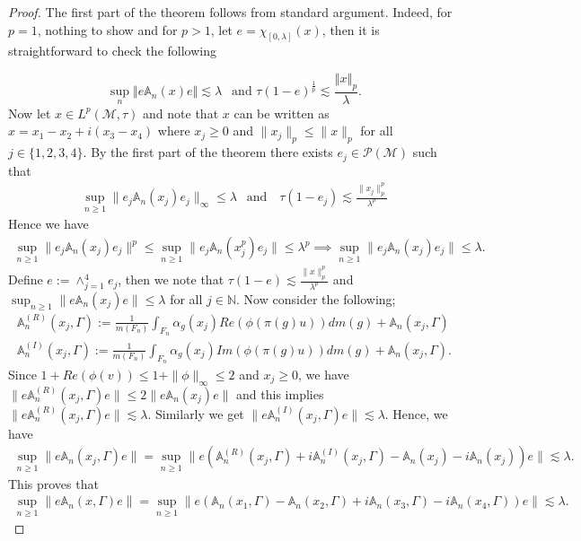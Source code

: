 \documentclass[11pt]{amsart}
\theoremstyle{definition}
\theoremstyle{myremark}
\numberwithin{equation}{section}
\def\A{\mathbb A}
\def\N{\mathbb N}
\newcommand{\CM}{\mathcal{M}}
\newcommand{\CP}{\mathcal{P}}
\newcommand{\norm}[1]{\left\Vert#1\right\Vert}
\begin{document}
\begin{proof}
The first part of the theorem follows from standard argument. Indeed, for $p=1$, nothing to show  and for $ p> 1$, let $e = \chi_{ [0, \lambda]}(x) $, then it is straightforward to check the following

$$ 
\sup_n \norm{ e\A_n( x) e } \lesssim \lambda ~~\text{ and } \tau( 1-e)^{ \frac{1}{p}}  \lesssim\frac{ \norm{ x}_p}{ \lambda}.
$$
Now let $ x \in L^p(\CM, \tau)$ and note that 
     $x$ can be written as $x=x_1-x_2+i(x_3-x_4)$ where $x_j \geq 0$ and $\|x_j\|_p \leq \|x\|_p $ for all $j\in \{1,2,3,4\}$.  By the first part of the theorem 
    there exists $e_j \in \CP(\CM)$ such that 
    \begin{align*}
        \displaystyle\sup_{n\geq1}\|e_j\A_n(x_j)e_j\|_\infty \leq \lambda ~~\text{ and }~~\ \tau(1-e_j)\lesssim \frac{\|x_j\|_p^p}{\lambda^p} 
    \end{align*}
  Hence we have 
    \begin{align*}
        \sup_{n\geq 1} \|e_j\A_n(x_j)e_j\|^p \leq  \sup_{n\geq 1} \|e_j\A_n(x_j^p)e_j\| \leq \lambda^p
        \implies  \sup_{n\geq 1} \|e_j\A_n(x_j)e_j\| \leq \lambda.
    \end{align*}
Define $e:=\wedge_{j=1}^4e_j$, then we note that  $\tau(1-e)\lesssim \frac{\|x\|_p^p}{\lambda^p}$ and  $\displaystyle\sup_{n\geq1}\|e\A_n(x_j)e\| \leq \lambda$ for all $ j \in \N$.
    Now consider the following;
    \begin{align*}
        \A_n^{(R)}(x_j,\Gamma):= \frac{1}{m(F_n)}\int_{F_n}\alpha_g(x_j)Re(\phi(\pi(g)u)) dm(g) + \A_n(x_j, \Gamma)\\
        \A_n^{(I)}(x_j,\Gamma):= \frac{1}{m(F_n)}\int_{F_n}\alpha_g(x_j)Im(\phi(\pi(g)u)) dm(g) + \A_n(x_j, \Gamma).
    \end{align*}
    Since $1+Re(\phi(v)) \leq 1+\|\phi\|_\infty \leq 2$ and $x_j \geq 0$,  we have  $ \|e\A_n^{(R)}(x_j,\Gamma)e\| \leq 2 \|e\A_n(x_j)e\|$
  and this implies  $  \|e\A_n^{(R)}(x_j,\Gamma)e\| \lesssim\lambda.$
    Similarly we get $  \|e\A_n^{(I)}(x_j,\Gamma)e\| \lesssim \lambda.$
Hence,  we have
\begin{align*}
    \sup_{n\geq 1}\|e\A_n(x_j, \Gamma)e\|=\sup_{n\geq 1}\|e(\A_n^{(R)}(x_j,\Gamma) +i\A_n^{(I)}(x_j,\Gamma) - \A_n(x_j)- i\A_n(x_j))e\| \lesssim \lambda.
\end{align*}
This proves that
    \begin{align*}
      \sup_{n\geq 1} \| e\A_n(x,\Gamma)e\|=\sup_{n\geq 1}\|e(\A_n(x_1,\Gamma)-\A_n(x_2,\Gamma)+i\A_n(x_3,\Gamma)-i\A_n(x_4,\Gamma))e\| \lesssim \lambda.

\end{align*}
\end{proof}
\end{document}
